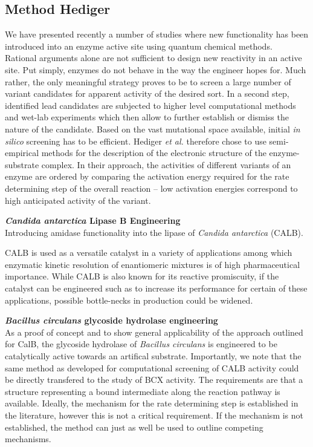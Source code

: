 \subsection{Method Hediger}
We have presented recently a number of studies where new functionality has been introduced into an enzyme active site using quantum chemical methods\cite{10.1371/journal.pone.0049849,hediger2013silico,hediger2013computational}.\\
Rational arguments alone are not sufficient to design new reactivity in an active site.
Put simply, enzymes do not behave in the way the engineer hopes for.
Much rather, the only meaningful strategy proves to be to screen a large number of variant candidates for apparent activity of the desired sort.
In a second step, identified lead candidates are subjected to higher level computational methods and wet-lab experiments which then allow to further establish or dismiss the nature of the candidate.
Based on the vast mutational space available, initial \textit{in silico} screening has to be efficient.
Hediger \textit{et al.} therefore chose to use semi-empirical methods for the description of the electronic structure of the enzyme-substrate complex.
In their approach, the activities of different variants of an enzyme are ordered by comparing the activation energy required for the rate determining step of the overall reaction -- low activation energies correspond to high anticipated activity of the variant.

\textbf{{\textit{Candida antarctica} Lipase B Engineering}}\\
Introducing amidase functionality into the lipase of \textit{Candida antarctica} (CALB).

CALB is used as a versatile catalyst in a variety of applications among which enzymatic kinetic resolution of enantiomeric mixtures is of high pharmaceutical importance\cite{gotor2006candida}.
While CALB is also known for its reactive promiscuity\cite{CBIC:CBIC200800318}, if the catalyst can be engineered such as to increase its performance for certain of these applications, possible bottle-necks in production could be widened.

\textbf{\textit{Bacillus circulans} glycoside hydrolase engineering}\\
As a proof of concept and to show general applicability of the approach outlined for CalB, the glycoside hydrolase of \textit{Bacillus circulans} is engineered to be catalytically active towards an artifical substrate.
Importantly, we note that the same method as developed for computational screening of CALB activity could be directly transfered to the study of BCX activity.
The requirements are that a structure representing a bound intermediate along the reaction pathway is available.
Ideally, the mechanism for the rate determining step is established in the literature, however this is not a critical requirement.
If the mechanism is not established, the method can just as well be used to outline competing mechanisms.

